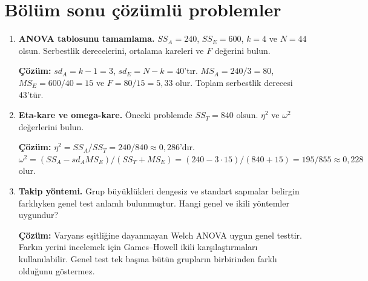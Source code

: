 \section{Bölüm sonu çözümlü problemler}

\begin{enumerate}
  \item \textbf{ANOVA tablosunu tamamlama.} $SS_A=240$, $SS_E=600$, $k=4$ ve $N=44$ olsun. Serbestlik derecelerini, ortalama kareleri ve $F$ değerini bulun.

  \textbf{Çözüm:} $sd_A=k-1=3$, $sd_E=N-k=40$'tır. $MS_A=240/3=80$, $MS_E=600/40=15$ ve $F=80/15=5{,}33$ olur. Toplam serbestlik derecesi 43'tür.

  \item \textbf{Eta-kare ve omega-kare.} Önceki problemde $SS_T=840$ olsun. $\eta^2$ ve $\omega^2$ değerlerini bulun.

  \textbf{Çözüm:} $\eta^2=SS_A/SS_T=240/840\approx0{,}286$'dır. $\omega^2=(SS_A-sd_A MS_E)/(SS_T+MS_E)=(240-3\cdot15)/(840+15)=195/855\approx0{,}228$ olur.

  \item \textbf{Takip yöntemi.} Grup büyüklükleri dengesiz ve standart sapmalar belirgin farklıyken genel test anlamlı bulunmuştur. Hangi genel ve ikili yöntemler uygundur?

  \textbf{Çözüm:} Varyans eşitliğine dayanmayan Welch ANOVA uygun genel testtir. Farkın yerini incelemek için Games--Howell ikili karşılaştırmaları kullanılabilir. Genel test tek başına bütün grupların birbirinden farklı olduğunu göstermez.
\end{enumerate}